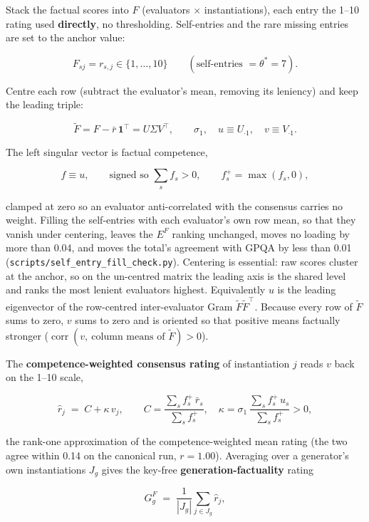 \documentclass{article}
\begin{document}
Stack the factual scores into \(F\) (evaluators \ensuremath{\times} instantiations), each entry the 1--10 rating used \textbf{directly}, no thresholding. Self-entries and the rare missing entries are set to the anchor value:

\[ F_{sj}=r_{s,j}\in\{1,\dots,10\}\qquad(\text{self-entries }=\theta^{*}=7). \tag{A5}\]

Centre each row (subtract the evaluator's mean, removing its leniency) and keep the leading triple:

\[ \tilde F = F-\bar r\,\mathbf 1^{\top}=U\Sigma V^{\top},\qquad \sigma_1,\quad u\equiv U_{\cdot 1},\quad v\equiv V_{\cdot 1}. \tag{A6}\]

The left singular vector is factual competence,

\[ f\equiv u,\qquad \text{signed so } \textstyle\sum_s f_s>0,\qquad f^{+}_s=\max(f_s,0), \tag{A7}\]

clamped at zero so an evaluator anti-correlated with the consensus carries no weight. Filling the self-entries with each evaluator's own row mean, so that they vanish under centering, leaves the \(E^{F}\) ranking unchanged, moves no loading by more than 0.04, and moves the total's agreement with GPQA by less than 0.01 (\texttt{scripts/self\_\allowbreak{}entry\_\allowbreak{}fill\_\allowbreak{}check.py}). Centering is essential: raw scores cluster at the anchor, so on the un-centred matrix the leading axis is the shared level and ranks the most lenient evaluators highest. Equivalently \(u\) is the leading eigenvector of the row-centred inter-evaluator Gram \(\tilde F\tilde F^{\top}\). Because every row of \(\tilde F\) sums to zero, \(v\) sums to zero and is oriented so that positive means factually stronger (\(\operatorname{corr}(v,\ \text{column means of }\tilde F)>0\)).

The \textbf{competence-weighted consensus rating} of instantiation \(j\) reads \(v\) back on the 1--10 scale,

\[ \hat r_j \;=\; C+\kappa\,v_j,\qquad C=\frac{\sum_s f^{+}_s\,\bar r_s}{\sum_s f^{+}_s},\quad \kappa=\sigma_1\,\frac{\sum_s f^{+}_s\,u_s}{\sum_s f^{+}_s}>0, \tag{A8}\]

the rank-one approximation of the competence-weighted mean rating (the two agree within 0.14 on the canonical run, \(r = 1.00\)). Averaging over a generator's own instantiations \(J_g\) gives the key-free \textbf{generation-factuality} rating

\[ G^{F}_{g} \;=\; \frac1{|J_g|}\sum_{j\in J_g}\hat r_j, \tag{A9}\]
\end{document}
